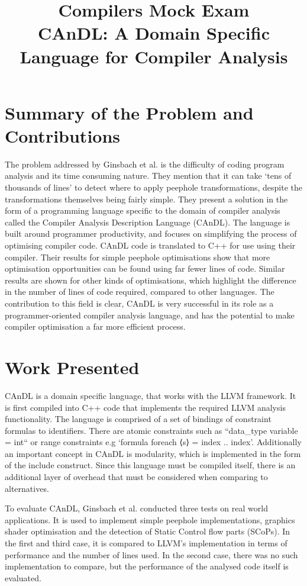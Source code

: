 \documentclass[12pt]{article}
\title{Compilers Mock Exam \\ CAnDL: A Domain Specific Language
for Compiler Analysis}
\begin{document}
\maketitle

\section{Summary of the Problem and Contributions}

The problem addressed by Ginsbach et al. is the difficulty of coding program analysis and its time consuming nature\cite{Ginsbach2018}. They mention that it can take `tens of thousands of lines' to detect where to apply peephole transformations, despite the transformations themselves being fairly simple. They present a solution in the form of a programming language specific to the domain of compiler analysis called the Compiler Analysis Description Language (CAnDL). The language is built around programmer productivity, and focuses on simplifying the process of optimising compiler code. CAnDL code is translated to C++ for use using their compiler. Their results for simple peephole optimisations show that more optimisation opportunities can be found using far fewer lines of code. Similar results are shown for other kinds of optimisations, which highlight the difference in the number of lines of code required, compared to other languages. The contribution to this field is clear, CAnDL is very successful in its role as a programmer-oriented compiler analysis language, and has the potential to make compiler optimisation a far more efficient process. 

\section{Work Presented}

CAnDL is a domain specific language, that works with the LLVM framework. It is first compiled into C++ code that implements the required LLVM analysis functionality. The language is comprised of a set of bindings of constraint formulas to identifiers. There are atomic constraints such as ``data\_type variable = int`` or range constraints e.g `formula foreach ⟨s⟩ = index .. index'. Additionally an important concept in CAnDL is modularity, which is implemented in the form of the include construct. Since this language must be compiled itself, there is an additional layer of overhead that must be considered when comparing to alternatives. 

To evaluate CAnDL, Ginsbach et al. conducted three tests on real world applications. It is used to implement simple peephole implementations, 	graphics shader optimisation and the detection of Static Control flow parts (SCoPs). In the first and third case, it is compared to LLVM's implementation in terms of performance and the number of lines used. In the second case, there was no such implementation to compare, but the performance of the analysed code itself is evaluated. 
\end{document}
